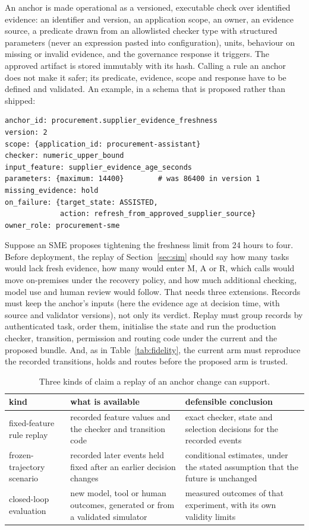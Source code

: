 \documentclass[11pt]{article}
\begin{document}
An anchor is made operational as a versioned, executable check over identified evidence: an
identifier and version, an application scope, an owner, an evidence source, a predicate drawn
from an allowlisted checker type with structured parameters (never an expression pasted into
configuration), units, behaviour on missing or invalid evidence, and the governance response it
triggers. The approved artifact is stored immutably with its hash. Calling a rule an anchor does
not make it safer; its predicate, evidence, scope and response have to be defined and validated.
An example, in a schema that is proposed rather than shipped:
\begin{verbatim}
anchor_id: procurement.supplier_evidence_freshness
version: 2
scope: {application_id: procurement-assistant}
checker: numeric_upper_bound
input_feature: supplier_evidence_age_seconds
parameters: {maximum: 14400}        # was 86400 in version 1
missing_evidence: hold
on_failure: {target_state: ASSISTED,
             action: refresh_from_approved_supplier_source}
owner_role: procurement-sme
\end{verbatim}
Suppose an SME proposes tightening the freshness limit from 24 hours to four. Before deployment,
the replay of Section~\ref{sec:sim} should say how many tasks would lack fresh evidence, how many
would enter M, A or R, which calls would move on-premises under the recovery policy, and how
much additional checking, model use and human review would follow. That needs three extensions.
Records must keep the anchor's inputs (here the evidence age at decision time, with source and
validator versions), not only its verdict. Replay must group records by authenticated task,
order them, initialise the state and run the production checker, transition, permission and
routing code under the current and the proposed bundle. And, as in
Table~\ref{tab:fidelity}, the current arm must reproduce the recorded transitions, holds and
routes before the proposed arm is trusted.

\begin{table}[t]
\centering
\small
\caption{Three kinds of claim a replay of an anchor change can support.}
\label{tab:smartreplay}
\begin{tabular}{@{}p{3.3cm}p{5.2cm}p{5.4cm}@{}}
\toprule
kind & what is available & defensible conclusion \\
\midrule
fixed-feature rule replay & recorded feature values and the checker and transition code &
  exact checker, state and selection decisions for the recorded events \\
frozen-trajectory scenario & recorded later events held fixed after an earlier decision changes &
  conditional estimates, under the stated assumption that the future is unchanged \\
closed-loop evaluation & new model, tool or human outcomes, generated or from a validated simulator &
  measured outcomes of that experiment, with its own validity limits \\
\bottomrule
\end{tabular}
\end{table}
\end{document}
